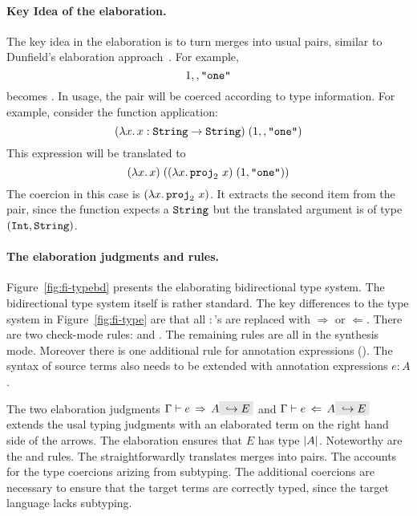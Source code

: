\paragraph{Key Idea of the elaboration.}
The key idea in the elaboration is to turn merges into usual pairs, similar to Dunfield's
elaboration approach~\cite{dunfield2014elaborating}.
For example, \[ 1 \mergeop \code{"one"} \] becomes 
{}. In usage, the pair will be coerced according to type
information. For example, consider the function application: 
\[ \app {(\lamty x {\code{String}} x : \code{String} \to \code{String})} {(1 \mergeop \code{"one"})} \] 
This expression will be translated to \[ \app
{(\lamty x {\code{String}} x)} {(\app {(\lamty x {\pair {\code{Int}} {\code{String}}} {\proj 2~x})}
{\pair 1 {\code{"one"}}})} \] The coercion in this case is $(\lamty x {\pair
{\code{Int}} {\code{String}}} {\proj 2~x})$. It extracts the second item from the pair, since
the function expects a $\code{String}$ but the translated argument is of type $\pair
{\code{Int}} {\code{String}}$.

\paragraph{The elaboration judgments and rules.}
Figure~\ref{fig:fi-typebd} presents the elaborating bidirectional type
system. The bidirectional type system itself is rather standard.  The
key differences to the type system in Figure~\ref{fig:fi-type} are
that all $:$'s are replaced with $\Rightarrow$ or $\Leftarrow$. There
are two check-mode rules:  and
. The remaining rules are all in the synthesis
mode. Moreover there is one additional rule for annotation expressions
(). The syntax of source terms also needs to be
extended with annotation expressions $e : A$. 

The two elaboration judgments $\jinfer \Gamma e A \yields E$ and
$\jcheck \Gamma e A \yields E$ extends the usal typing judgments with
an elaborated term on the right hand side of the arrows. The
elaboration ensures that $E$ has type $\im A$. 
Noteworthy are the  
and  rules. The 
straightforwardly translates merges into pairs. The
 accounts for the type coercions arizing 
from subtyping. The additional coercions are necessary to ensure that
the target terms are correctly typed, since the target language lacks
subtyping.

